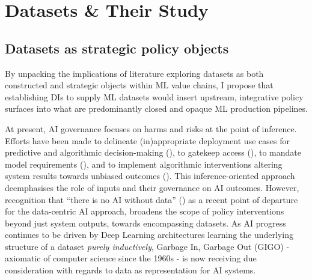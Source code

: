 \chapter{Datasets \& Their Study}

\section*{Datasets as strategic policy objects}

By unpacking the implications of literature exploring datasets as both constructed and strategic objects within ML value chains, I propose that establishing DIs to supply ML datasets would insert upstream, integrative policy surfaces into what are predominantly closed and opaque ML production pipelines. 

At present, AI governance focuses on harms and risks at the point of inference. Efforts have been made to delineate (in)appropriate deployment use cases for predictive and algorithmic decision-making (\cite{lum2016PredictServe, birhane2022AutomatingAmbiguityChallenges, aragon2022HumanCenteredDataScience}), to gatekeep access (\cite{shevlane2022StructuredAccessEmerging, gorwa2024ModeratingModelMarketplaces, shrestha2023BuildingOpensourceAI}), to mandate model requirements (\cite{bommasani2024FoundationModelTransparency}), and to implement algorithmic interventions altering system results towards unbiased outcomes (\cite{dwork2012FairnessAwareness, zhao2018GenderBiasCoreference, wang2022REVISEToolMeasuring, bellamy2018AIFairness360, googleGeminiVerge}). This inference-oriented approach deemphasises the role of inputs and their governance on AI outcomes. However, recognition that “there is no AI without data” (\cite{groger2021ThereNoAI, 2023WhatWeMean}) as a recent point of departure for the data-centric AI approach, broadens the scope of policy interventions beyond just system outputs, towards encompassing datasets. As AI progress continues to be driven by Deep Learning architectures learning the underlying structure of a dataset \textit{purely inductively}, Garbage In, Garbage Out (GIGO) - axiomatic of computer science since the 1960s - is now receiving due consideration with regards to data as representation for AI systems.

